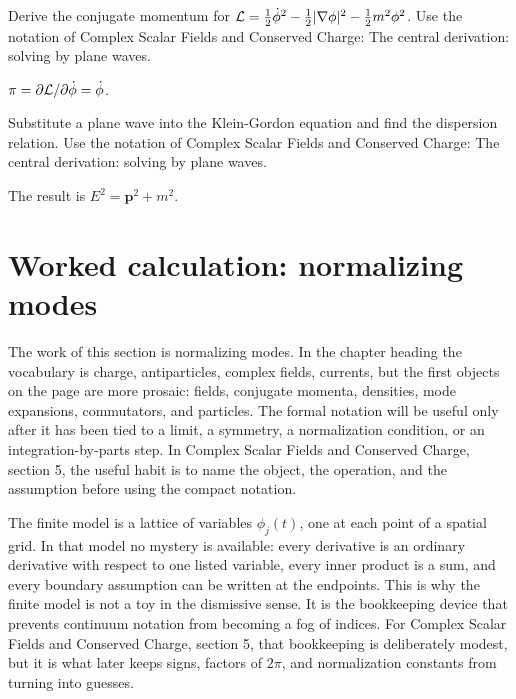 \begin{exercise}
Derive the conjugate momentum for \(\mathcal L=\frac12\dot\phi^2-\frac12|\nabla\phi|^2-\frac12m^2\phi^2\).  Use the notation of Complex Scalar Fields and Conserved Charge: The central derivation: solving by plane waves.
\begin{answer}
\(\pi=\partial\mathcal L/\partial\dot\phi=\dot\phi\).
\end{answer}
\end{exercise}

\begin{exercise}
Substitute a plane wave into the Klein-Gordon equation and find the dispersion relation.  Use the notation of Complex Scalar Fields and Conserved Charge: The central derivation: solving by plane waves.
\begin{answer}
The result is \(E^2=\bm p^2+m^2\).
\end{answer}
\end{exercise}



\section{Worked calculation: normalizing modes}

The work of this section is normalizing modes.  In the chapter heading the vocabulary is charge, antiparticles, complex fields, currents, but the first objects on the page are more prosaic: fields, conjugate momenta, densities, mode expansions, commutators, and particles.  The formal notation will be useful only after it has been tied to a limit, a symmetry, a normalization condition, or an integration-by-parts step.  In Complex Scalar Fields and Conserved Charge, section 5, the useful habit is to name the object, the operation, and the assumption before using the compact notation.

The finite model is a lattice of variables \(\phi_j(t)\), one at each point of a spatial grid.  In that model no mystery is available: every derivative is an ordinary derivative with respect to one listed variable, every inner product is a sum, and every boundary assumption can be written at the endpoints.  This is why the finite model is not a toy in the dismissive sense.  It is the bookkeeping device that prevents continuum notation from becoming a fog of indices.  For Complex Scalar Fields and Conserved Charge, section 5, that bookkeeping is deliberately modest, but it is what later keeps signs, factors of \(2\pi\), and normalization constants from turning into guesses.


